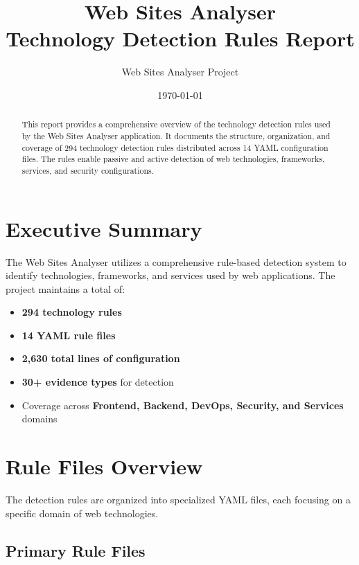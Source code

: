 \documentclass[11pt,a4paper,oneside]{article}
\title{\textbf{Web Sites Analyser} \\ Technology Detection Rules Report}
\author{Web Sites Analyser Project}
\date{\today}
\begin{document}
\maketitle

\begin{abstract}
This report provides a comprehensive overview of the technology detection rules used by the Web Sites Analyser application. It documents the structure, organization, and coverage of 294 technology detection rules distributed across 14 YAML configuration files. The rules enable passive and active detection of web technologies, frameworks, services, and security configurations.
\end{abstract}

\tableofcontents
\newpage

\section{Executive Summary}

The Web Sites Analyser utilizes a comprehensive rule-based detection system to identify technologies, frameworks, and services used by web applications. The project maintains a total of:

\begin{itemize}
    \item \textbf{294 technology rules}
    \item \textbf{14 YAML rule files}
    \item \textbf{2,630 total lines of configuration}
    \item \textbf{30+ evidence types} for detection
    \item Coverage across \textbf{Frontend, Backend, DevOps, Security, and Services} domains
\end{itemize}

\section{Rule Files Overview}

The detection rules are organized into specialized YAML files, each focusing on a specific domain of web technologies.

\subsection{Primary Rule Files}
\end{document}
